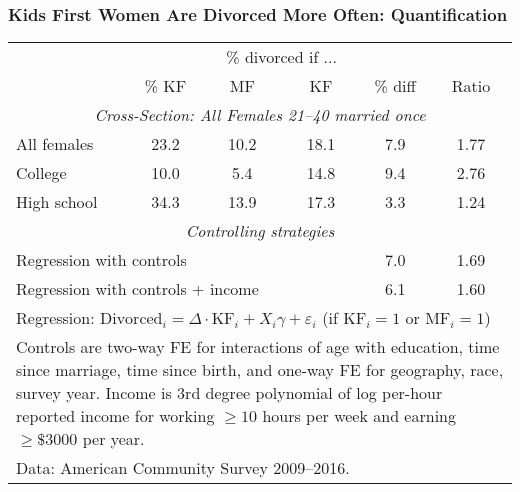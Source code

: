 \documentclass[aspectratio=169]{beamer}
\begin{document}
\begin{frame}
\frametitle{Kids First Women Are Divorced More Often: Quantification}
\begin{center}
\begin{tabular}{l c c c c c}\hline
& &  \multicolumn{2}{c}{\small \% divorced if ...} \\
& \% KF & MF & KF & \% diff &  Ratio \\\hline
\multicolumn{6}{c}{\textit{Cross-Section: All Females 21--40 married once}}\\
All females & 23.2 &  10.2 & 18.1 & 7.9 & 1.77  \\
College & 10.0 & 5.4 & 14.8 & 9.4 & 2.76 \\
High school & 34.3 & 13.9 & 17.3 & 3.3 & 1.24 \\\hline
\multicolumn{6}{c}{\textit{Controlling strategies}}\\\hline
\multicolumn{4}{l}{Regression with controls}   & 7.0 & 1.69 \\
\multicolumn{4}{l}{Regression with controls + income}   & 6.1 & 1.60 \\\hline
\multicolumn{6}{p{0.7\linewidth}}{\footnotesize Regression: $\text{Divorced}_i = \Delta \cdot \text{KF}_i + X_i\gamma + \varepsilon_i$ (if $\text{KF}_i = 1$ or $\text{MF}_i = 1$)}\\
\multicolumn{6}{p{0.7\linewidth}}{\footnotesize Controls are two-way FE for interactions of age with education, time since marriage, time since birth, and one-way FE for geography, race, survey year. 
Income is 3rd degree polynomial of log per-hour reported income for working $\geq 10$ hours per week and earning $\geq \$3000$ per year.
}\\
\multicolumn{6}{p{0.7\linewidth}}{\footnotesize Data: American Community Survey 2009--2016.}\\\hline
\end{tabular}
\end{center}
\end{frame}
\end{document}
